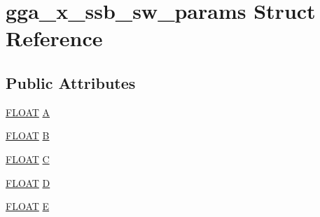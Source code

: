 \hypertarget{structgga__x__ssb__sw__params}{\section{gga\-\_\-x\-\_\-ssb\-\_\-sw\-\_\-params Struct Reference}
\label{structgga__x__ssb__sw__params}
}
\subsection*{Public Attributes}
\begin{DoxyCompactItemize}
\item 
\hyperlink{src_2xc__config_8h_ae8690abbffa85934d64d545920e2b108}{F\-L\-O\-A\-T} \hyperlink{structgga__x__ssb__sw__params_a0affa662508df3020cfab58cb8334fd0}{A}
\item 
\hyperlink{src_2xc__config_8h_ae8690abbffa85934d64d545920e2b108}{F\-L\-O\-A\-T} \hyperlink{structgga__x__ssb__sw__params_a06f2af586d00e148954ba93fab95227c}{B}
\item 
\hyperlink{src_2xc__config_8h_ae8690abbffa85934d64d545920e2b108}{F\-L\-O\-A\-T} \hyperlink{structgga__x__ssb__sw__params_a38600926b72c57ec4008a2ae6a9ffbb1}{C}
\item 
\hyperlink{src_2xc__config_8h_ae8690abbffa85934d64d545920e2b108}{F\-L\-O\-A\-T} \hyperlink{structgga__x__ssb__sw__params_a79e2bac7e20eda6c32f450078feb18e1}{D}
\item 
\hyperlink{src_2xc__config_8h_ae8690abbffa85934d64d545920e2b108}{F\-L\-O\-A\-T} \hyperlink{structgga__x__ssb__sw__params_af27cc735acaf829c87fe911fd1f7f372}{E}
\end{DoxyCompactItemize}


